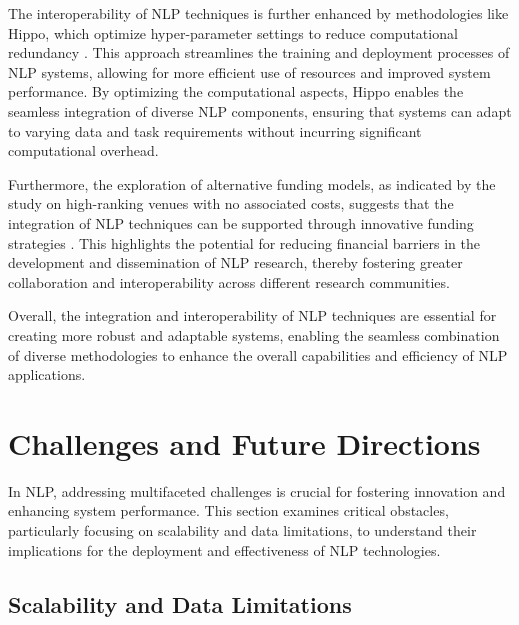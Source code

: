 The interoperability of NLP techniques is further enhanced by methodologies like Hippo, which optimize hyper-parameter settings to reduce computational redundancy \cite{shin2020hippotaminghyperparameteroptimization}. This approach streamlines the training and deployment processes of NLP systems, allowing for more efficient use of resources and improved system performance. By optimizing the computational aspects, Hippo enables the seamless integration of diverse NLP components, ensuring that systems can adapt to varying data and task requirements without incurring significant computational overhead.



Furthermore, the exploration of alternative funding models, as indicated by the study on high-ranking venues with no associated costs, suggests that the integration of NLP techniques can be supported through innovative funding strategies \cite{cohen2015costreadingresearchstudy}. This highlights the potential for reducing financial barriers in the development and dissemination of NLP research, thereby fostering greater collaboration and interoperability across different research communities.



Overall, the integration and interoperability of NLP techniques are essential for creating more robust and adaptable systems, enabling the seamless combination of diverse methodologies to enhance the overall capabilities and efficiency of NLP applications.















\section{Challenges and Future Directions} \label{sec:Challenges and Future Directions}

In NLP, addressing multifaceted challenges is crucial for fostering innovation and enhancing system performance. This section examines critical obstacles, particularly focusing on scalability and data limitations, to understand their implications for the deployment and effectiveness of NLP technologies. 


\subsection{Scalability and Data Limitations} \label{subsec:Scalability and Data Limitations}

